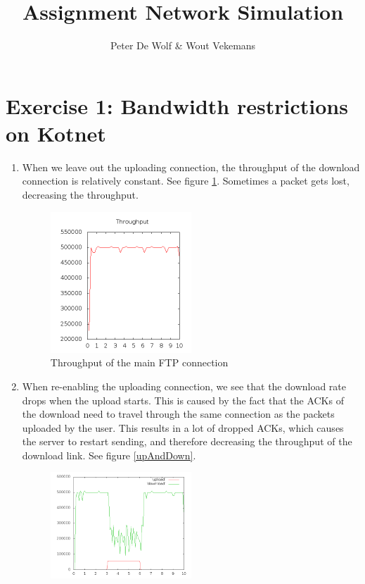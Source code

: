 \documentclass[a4paper,12pt,titlepage]{report}
\title{Assignment Network Simulation}
\author{Peter De Wolf \& Wout Vekemans}
\begin{document}
\begin{titlepage}
	\maketitle
	\thispagestyle{empty}
\end{titlepage}

\section{Exercise 1: Bandwidth restrictions on Kotnet}
\begin{enumerate}
 \item When we leave out the uploading connection, the throughput of the download connection is relatively constant. See figure \ref{noUpload}. Sometimes a packet gets lost, decreasing the throughput.\\
  \begin{figure}[htb]
\centering
\includegraphics[width=0.5\textwidth]{noUpload.png}
\caption{Throughput of the main FTP connection}
\label{noUpload}
\end{figure}
\item When re-enabling the uploading connection, we see that the download rate drops when the upload starts. This is caused by the fact that the ACKs of the download need to travel through the same connection as the packets uploaded by the user. This results in a lot of dropped ACKs, which causes the server to restart sending, and therefore decreasing the throughput of the download link. See figure \ref{upAndDown}.\\
  \begin{figure}[htb]
\centering
\includegraphics[width=0.5\textwidth]{withUpload.png}

\end{figure}
\end{enumerate}
\end{document}
